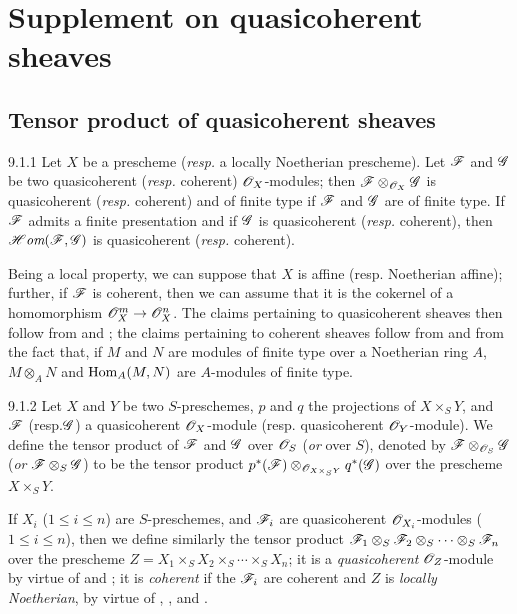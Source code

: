 \documentclass[10pt,oneside]{book}
\begin{document}
\section{Supplement on quasicoherent sheaves}
\label{1-schemes-9}

\subsection{Tensor product of quasicoherent sheaves}
\label{1-schemes-9.1}

\begin{envs}[Proposition]{9.1.1}
\label{prop-1.9.1.1}
Let $X$ be a prescheme (\emph{resp.} a locally Noetherian prescheme). Let $\mathscr{F}$ and
$\mathscr{G}$ be two quasicoherent (\emph{resp.} coherent) $\mathscr{O}_X$-modules; then
$\mathscr{F}\otimes_{\mathscr{O}_X}\mathscr{G}$ is quasicoherent (\emph{resp.} coherent) and
of finite type if $\mathscr{F}$ and $\mathscr{G}$ are of finite type. If
$\mathscr{F}$ admits a finite presentation and if $\mathscr{G}$ is quasicoherent
(\emph{resp.} coherent), then $\mathscr{H}\textit{om}(\mathscr{F},\mathscr{G})$ is quasicoherent
(\emph{resp.} coherent).
\end{envs}

Being a local property, we can suppose that $X$ is affine (resp. Noetherian
affine); further, if $\mathscr{F}$ is coherent, then we can assume that it is the
cokernel of a homomorphism $\mathscr{O}_X^m\to\mathscr{O}_X^n$. The claims pertaining to
quasicoherent sheaves then follow from  and ; the
claims pertaining to coherent sheaves follow from  and from the fact
that, if $M$ and $N$ are modules of finite type over a Noetherian ring $A$,
$M\otimes_A N$ and ${\mathop{\mathrm{Hom}}\nolimits}_A(M,N)$ are $A$-modules of finite type.

\begin{envs}[Definition]{9.1.2}
\label{defn-1.9.1.2}
Let $X$ and $Y$ be two $S$-preschemes, $p$ and
$q$ the projections of $X\times_S Y$, and $\mathscr{F}$ (resp.$\mathscr{G}$) a
quasicoherent $\mathscr{O}_X$-module (resp. quasicoherent $\mathscr{O}_Y$-module). We define the
tensor product of $\mathscr{F}$ and $\mathscr{G}$ over $\mathscr{O}_S$ (\emph{or} over $S$),
denoted by $\mathscr{F}\otimes_{\mathscr{O}_S}\mathscr{G}$ (\emph{or}
$\mathscr{F}\otimes_S\mathscr{G}$) to be the tensor product
$p^*(\mathscr{F})\otimes_{\mathscr{O}_{X\times_S Y}}q^*(\mathscr{G})$ over the
prescheme $X\times_S Y$.
\end{envs}

If $X_i$ ($1\leqslant i\leqslant n$) are $S$-preschemes, and $\mathscr{F}_i$ are quasicoherent
$\mathscr{O}_{X_i}$-modules ($1\leqslant i\leqslant n$), then we define similarly the tensor product
$\mathscr{F}_1\otimes_S\mathscr{F}_2\otimes_S\cdots\otimes_S\mathscr{F}_n$ over the
prescheme $Z=X_1\times_S X_2\times_S\cdots\times_S X_n$; it is a
\emph{quasicoherent} $\mathscr{O}_Z$-module by virtue of  and
; it is \emph{coherent} if the $\mathscr{F}_i$ are coherent and
$Z$ is \emph{locally Noetherian}, by virtue of ,
, and .
\end{document}
